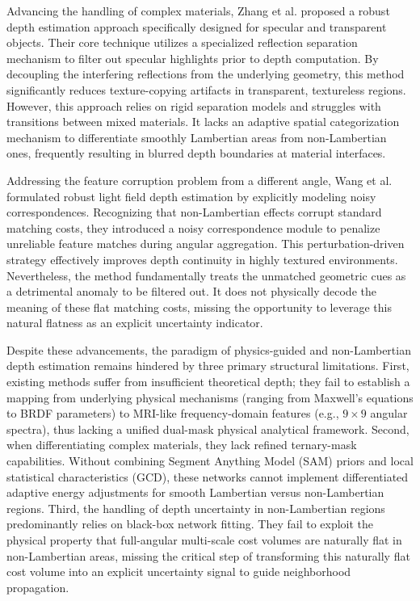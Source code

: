 \documentclass[lettersize,journal]{IEEEtran}
\begin{document}
Advancing the handling of complex materials, Zhang et al. \cite{zhang2023} proposed a robust depth estimation approach specifically designed for specular and transparent objects. Their core technique utilizes a specialized reflection separation mechanism to filter out specular highlights prior to depth computation. By decoupling the interfering reflections from the underlying geometry, this method significantly reduces texture-copying artifacts in transparent, textureless regions. However, this approach relies on rigid separation models and struggles with transitions between mixed materials. It lacks an adaptive spatial categorization mechanism to differentiate smoothly Lambertian areas from non-Lambertian ones, frequently resulting in blurred depth boundaries at material interfaces.

Addressing the feature corruption problem from a different angle, Wang et al. \cite{wang2023} formulated robust light field depth estimation by explicitly modeling noisy correspondences. Recognizing that non-Lambertian effects corrupt standard matching costs, they introduced a noisy correspondence module to penalize unreliable feature matches during angular aggregation. This perturbation-driven strategy effectively improves depth continuity in highly textured environments. Nevertheless, the method fundamentally treats the unmatched geometric cues as a detrimental anomaly to be filtered out. It does not physically decode the meaning of these flat matching costs, missing the opportunity to leverage this natural flatness as an explicit uncertainty indicator.

Despite these advancements, the paradigm of physics-guided and non-Lambertian depth estimation remains hindered by three primary structural limitations. First, existing methods suffer from insufficient theoretical depth; they fail to establish a mapping from underlying physical mechanisms (ranging from Maxwell's equations to BRDF parameters) to MRI-like frequency-domain features (e.g., $9 \times 9$ angular spectra), thus lacking a unified dual-mask physical analytical framework. Second, when differentiating complex materials, they lack refined ternary-mask capabilities. Without combining Segment Anything Model (SAM) priors \cite{kirillov2023} and local statistical characteristics (GCD), these networks cannot implement differentiated adaptive energy adjustments for smooth Lambertian versus non-Lambertian regions. Third, the handling of depth uncertainty in non-Lambertian regions predominantly relies on black-box network fitting. They fail to exploit the physical property that full-angular multi-scale cost volumes are naturally flat in non-Lambertian areas, missing the critical step of transforming this naturally flat cost volume into an explicit uncertainty signal to guide neighborhood propagation.
\end{document}
